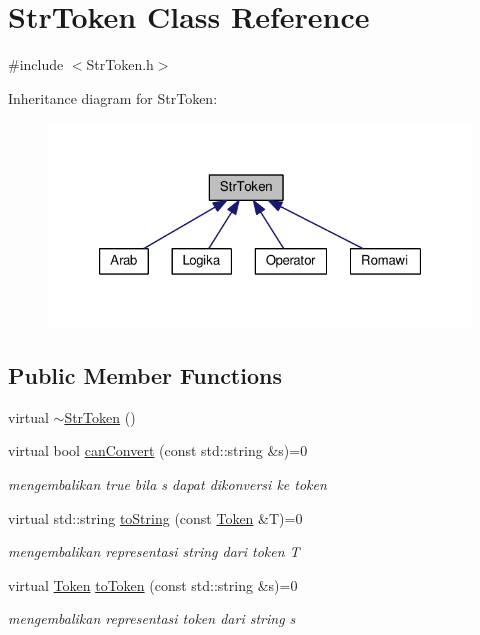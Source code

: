 \hypertarget{class_str_token}{\section{Str\-Token Class Reference}
\label{class_str_token}
}


{\ttfamily \#include $<$Str\-Token.\-h$>$}



Inheritance diagram for Str\-Token\-:\nopagebreak
\begin{figure}[H]
\begin{center}
\leavevmode
\includegraphics[width=323pt]{class_str_token__inherit__graph}
\end{center}
\end{figure}
\subsection*{Public Member Functions}
\begin{DoxyCompactItemize}
\item 
virtual \hyperlink{class_str_token_a6b1f19d7b05dd697084b743fb1fcf38b}{$\sim$\-Str\-Token} ()
\item 
virtual bool \hyperlink{class_str_token_acd92c843b3b092c21d5a038c5d336957}{can\-Convert} (const std\-::string \&s)=0
\begin{DoxyCompactList}\small\item\em mengembalikan true bila s dapat dikonversi ke token \end{DoxyCompactList}\item 
virtual std\-::string \hyperlink{class_str_token_a9562cf6aff9cefa7a223d78573755e8e}{to\-String} (const \hyperlink{class_token}{Token} \&T)=0
\begin{DoxyCompactList}\small\item\em mengembalikan representasi string dari token T \end{DoxyCompactList}\item 
virtual \hyperlink{class_token}{Token} \hyperlink{class_str_token_ae3f06fac8d7030218db0d833fae6f773}{to\-Token} (const std\-::string \&s)=0
\begin{DoxyCompactList}\small\item\em mengembalikan representasi token dari string s \end{DoxyCompactList}\end{DoxyCompactItemize}


